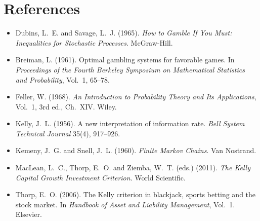 \documentclass[11pt,a4paper]{article}
\begin{document}
\section*{References}
\begin{itemize}
\item[] Dubins, L.~E. and Savage, L.~J. (1965). \emph{How to Gamble If You Must:
Inequalities for Stochastic Processes}. McGraw-Hill.
\item[] Breiman, L. (1961). Optimal gambling systems for favorable games. In
\emph{Proceedings of the Fourth Berkeley Symposium on Mathematical Statistics and
Probability}, Vol.~1, 65--78.
\item[] Feller, W. (1968). \emph{An Introduction to Probability Theory and Its
Applications}, Vol.~1, 3rd ed., Ch.~XIV. Wiley.
\item[] Kelly, J.~L. (1956). A new interpretation of information rate. \emph{Bell
System Technical Journal} 35(4), 917--926.
\item[] Kemeny, J.~G. and Snell, J.~L. (1960). \emph{Finite Markov Chains}. Van Nostrand.
\item[] MacLean, L.~C., Thorp, E.~O. and Ziemba, W.~T. (eds.) (2011). \emph{The Kelly
Capital Growth Investment Criterion}. World Scientific.
\item[] Thorp, E.~O. (2006). The Kelly criterion in blackjack, sports betting and the
stock market. In \emph{Handbook of Asset and Liability Management}, Vol.~1. Elsevier.
\end{itemize}
\end{document}
